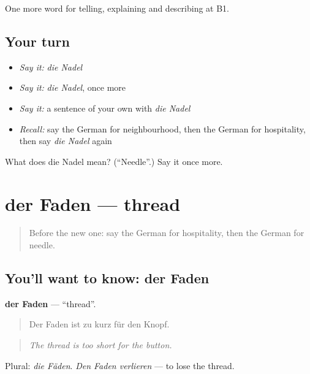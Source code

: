 \begin{grammarlens}[title={What you've built}]
One more word for telling, explaining and describing at B1.
\end{grammarlens}

\subsection*{Your turn}
\begin{itemize}
\raggedright
  \item \emph{Say it:} \emph{die Nadel}
  \item \emph{Say it:} \emph{die Nadel}, once more
  \item \emph{Say it:} a sentence of your own with \emph{die Nadel}
  \item \emph{Recall:} say the German for neighbourhood, then the German for hospitality, then say \emph{die Nadel} again
\end{itemize}

\begin{tcolorbox}[breakable,colback=teal!4,colframe=teal!35!black,title={Before you move on}]
What does die Nadel mean? (\textquotedblleft{}Needle\textquotedblright{}.) Say it once more.
\end{tcolorbox}
\section[der Faden]{der Faden — thread}

\label{lesson:GE-C499-faden}



\begin{quote}
Before the new one: say the German for hospitality, then the German for needle.
\end{quote}

\subsection*{You'll want to know: der Faden}
\textbf{der Faden} — \textquotedblleft{}thread\textquotedblright{}.

\begin{quote}
Der Faden ist zu kurz für den Knopf.
\end{quote}

\begin{quote}
\emph{The thread is too short for the button.}
\end{quote}

Plural: \emph{die Fäden}. \emph{Den Faden verlieren} — to lose the thread.

